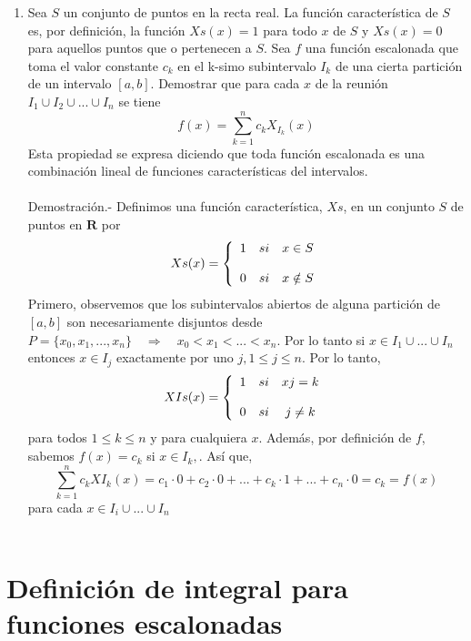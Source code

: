 \begin{enumerate}[ \bfseries 1.]
    \item Sea $S$ un conjunto de puntos en la recta real. La función característica de $S$ es, por definición, la función $Xs(x)=1$ para todo $x$ de $S$ y $Xs(x)=0$ para aquellos puntos que o pertenecen a $S$. Sea $f$ una función escalonada que toma el valor constante $c_k$ en el k-simo subintervalo $I_k$ de una cierta partición de un intervalo $[a,b]$. Demostrar que para cada $x$ de la reunión $I_1 \cup I_2 \cup ... \cup I_n$ se tiene $$f(x)=\sum\limits_{k=1}^{n} c_k X_{I_k} (x)$$ Esta propiedad se expresa diciendo que toda función escalonada es una combinación lineal de funciones características del intervalos.\\\\
	Demostración.-\; Definimos una función característica, $Xs$, en un conjunto $S$ de puntos en $\mathbf{R}$ por 
	$$Xs(x)=\left\{\begin{array}{c c c} 
	    1&si&x\in S\\ 
	    \\0&si&x \notin S \\
	\end{array}\right.$$
	Primero, observemos que los subintervalos abiertos de alguna partición de $[a,b]$ son necesariamente disjuntos desde $P=\lbrace x_0,x_1,...,x_n \rbrace \quad \Longrightarrow \quad x_0<x_1<...<x_n$. Por lo tanto si $x\in I_1 \cup ... \cup I_n$ entonces $x \in I_j$ exactamente por uno $j, 1\leq j \leq n$. Por lo tanto,
	$$XIs(x)=\left\{\begin{array}{c c c} 
	    1&si&xj=k\\ 
	    \\0&si&j\neq k \\
	\end{array}\right.$$
	para todos $1\leq k\leq n$ y para cualquiera $x$. Además, por definición de $f$, sabemos $f(x)=c_k$ si $x\in I_k,$. Así que, 
	$$\sum\limits_{k=1}^{n} c_k XI_k(x) = c_1\cdot 0 + c_2 \cdot 0 + ... + c_k\cdot 1 + ... + c_n\cdot 0 = c_k = f(x)$$
	para cada $x\in I_i \cup ... \cup I_n$\\\\

    \end{enumerate}
   
\section{Definición de integral para funciones escalonadas}

